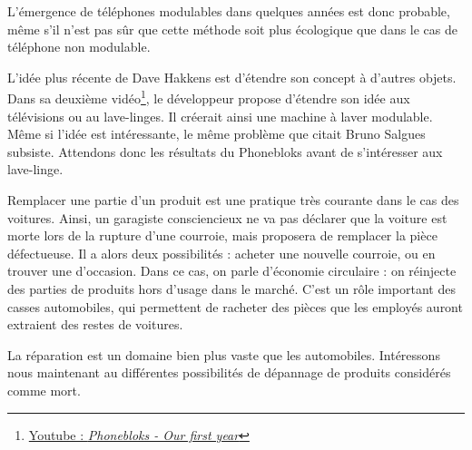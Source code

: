 \medbreak 

L'émergence de téléphones modulables dans quelques années est donc probable, même s'il n'est pas sûr que cette méthode soit plus écologique que dans le cas de téléphone non modulable. 

L'idée plus récente de Dave Hakkens est d'étendre son concept à d'autres objets. Dans sa deuxième vidéo\footnote{\href{https://www.youtube.com/watch?v=4KmewIC-eV4}{Youtube : \textit{Phonebloks - Our first year}}}, le développeur propose d'étendre son idée aux télévisions ou au lave-linges. Il créerait ainsi une machine à laver modulable. Même si l'idée est intéressante, le même problème que citait Bruno Salgues subsiste. Attendons donc les résultats du Phonebloks avant de s'intéresser aux lave-linge. 

\bigbreak

Remplacer une partie d'un produit est une pratique très courante dans le cas des voitures. 
Ainsi, un garagiste consciencieux ne va pas déclarer que la voiture est morte lors de la rupture d'une courroie, mais proposera de remplacer la pièce défectueuse. Il a alors deux possibilités : acheter une nouvelle courroie, ou en trouver une d'occasion. Dans ce cas, on parle d'économie circulaire : on réinjecte des parties de produits hors d'usage dans le marché. C'est un rôle important des casses automobiles, qui permettent de racheter des pièces que les employés auront extraient des restes de voitures. 

La réparation est un domaine bien plus vaste que les automobiles. Intéressons nous maintenant au différentes possibilités de dépannage de produits considérés comme mort. 